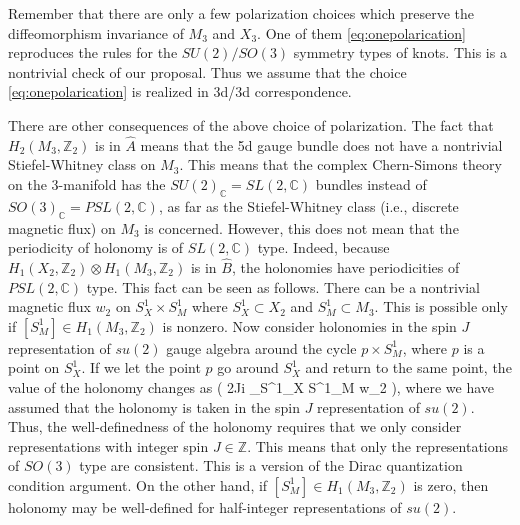 \documentclass[a4paper,11pt]{article}
\def\BC{{\mathbb C}}
\def\BZ{{\mathbb Z}}
\def\beq#1\eeq{\begin{align}#1\end{align}}
\begin{document}
Remember that there are only a few polarization choices which preserve the diffeomorphism invariance of $M_3$ and $X_3$.
One of them \eqref{eq:onepolarication} reproduces the rules for the $SU(2)/SO(3)$ symmetry types of knots.
This is a nontrivial check of our proposal.
Thus we assume that the choice \eqref{eq:onepolarication} is realized in 3d/3d correspondence.

There are other consequences of the above choice of polarization.
The fact that $H_2(M_3,\BZ_2) $ is in $\hat{A}$ means that the 5d gauge bundle does not have a nontrivial Stiefel-Whitney class on $M_3$.
This means that the complex Chern-Simons theory on the 3-manifold has the $SU(2)_\BC=SL(2,\BC)$ bundles instead of $SO(3)_\BC=PSL(2,\BC)$,
as far as the Stiefel-Whitney class (i.e., discrete magnetic flux) on $M_3$ is concerned. However, this does not mean that the periodicity of holonomy is of $SL(2,\BC)$ type.
Indeed, because $H_1(X_2,\BZ_2) \otimes H_1(M_3,\BZ_2)$ is in $\hat{B}$, the holonomies have periodicities of $PSL(2,\BC)$ type.
This fact can be seen as follows. There can be a nontrivial magnetic flux $w_2$ on $S^1_X \times S^1_M$ where $S^1_X \subset X_2$ and $S^1_M \subset M_3$.
This is possible only if $[S^1_M] \in H_1(M_3,\BZ_2)$ is nonzero.
Now consider holonomies in the spin $J$ representation of $su(2)$ gauge algebra around the cycle $p \times S^1_M$, where $p$ is a point on $S^1_X$.
If we let the point $p$ go around $S^1_X$ and return to the same point, the value of the holonomy changes as 
\beq
\exp ( 2J\pi i \int_{S^1_X \times S^1_M} w_2 ),
\eeq
where we have assumed that the holonomy is taken in the spin $J$ representation of $su(2)$. 
Thus, the well-definedness of the holonomy requires that we only consider representations with integer spin $J \in \BZ$. This means that only the representations of $SO(3)$ type are consistent.
This is a version of the Dirac quantization condition argument.
On the other hand, if $[S^1_M] \in H_1(M_3,\BZ_2) $ is zero, then holonomy may be well-defined for half-integer representations of $su(2)$.
\end{document}
